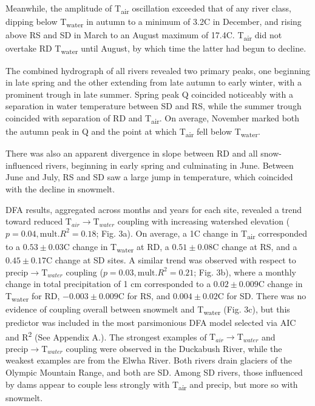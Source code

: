 \documentclass[notitlepage]{article}
\begin{document}
Meanwhile, the amplitude of T\textsubscript{air} oscillation exceeded that of any river class, dipping below T\textsubscript{water} in autumn to a minimum of 3.2\degree C in December, and rising above RS and SD in March to an August maximum of 17.4\degree C. T\textsubscript{air} did not overtake RD T\textsubscript{water} until August, by which time the latter had begun to decline.

The combined hydrograph of all rivers revealed two primary peaks, one beginning in late spring and the other extending from late autumn to early winter, with a prominent trough in late summer. Spring peak Q coincided noticeably with a separation in water temperature between SD and RS, while the summer trough coincided with separation of RD and T\textsubscript{air}. On average, November marked both the autumn peak in Q and the point at which T\textsubscript{air} fell below T\textsubscript{water}.

There was also an apparent divergence in slope between RD and all snow-influenced rivers, beginning in early spring and culminating in June. Between June and July, RS and SD saw a large jump in temperature, which coincided with the decline in snowmelt.

DFA results, aggregated across months and years for each site, revealed a trend toward reduced $\textrm{T}_{air}\rightarrow \textrm{T}_{water}$ coupling with increasing watershed elevation ($p=0.04, \textrm{mult.} R^2=0.18$; Fig. 3a). On average, a 1\degree C change in T\textsubscript{air} corresponded to a $0.53\pm 0.03$\degree C change in T\textsubscript{water} at RD, a $0.51\pm 0.08$\degree C change at RS, and a $0.45\pm 0.17$\degree C change at SD sites. A similar trend was observed with respect to $\textrm{precip}\rightarrow \textrm{T}_{water}$ coupling ($p=0.03, \textrm{mult.} R^2=0.21$; Fig. 3b), where a monthly change in total precipitation of 1 cm corresponded to a $0.02\pm 0.009$\degree C change in T\textsubscript{water} for RD, $-0.003\pm 0.009$\degree C for RS, and $0.004\pm 0.02$\degree C for SD. There was no evidence of coupling overall between snowmelt and T\textsubscript{water} (Fig. 3c), but this predictor was included in the most parsimonious DFA model selected via AIC and R\textsuperscript{2} (See Appendix A.). The strongest examples of $\textrm{T}_{air}\rightarrow \textrm{T}_{water}$ and $\textrm{precip}\rightarrow \textrm{T}_{water}$ coupling were observed in the Duckabush River, while the weakest examples are from the Elwha River. Both rivers drain glaciers of the Olympic Mountain Range, and both are SD. Among SD rivers, those influenced by dams appear to couple less strongly with T\textsubscript{air} and precip, but more so with snowmelt.
\end{document}
